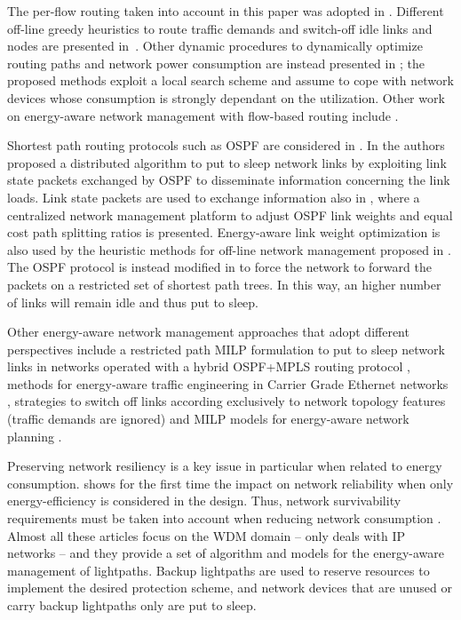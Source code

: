 \documentclass[final,5p,times,twocolumn]{elsarticle}
\begin{document}
The per-flow routing  taken into account in this paper was adopted in \cite{chiaraviglio11a,vasic10,avallone12}. Different off-line greedy heuristics to route traffic demands and switch-off idle links and nodes are presented in~\cite{chiaraviglio11a}. Other dynamic procedures to dynamically optimize routing paths and network power consumption are instead presented in  \cite{vasic10}; the proposed methods exploit a local search scheme and assume to cope with network devices whose consumption is strongly dependant on the utilization. Other work on energy-aware network management with flow-based routing include \cite{garroppo12a,garroppo12b,athanasiou11,chu11,coiro13,galanjiménez13,giroire12}.

Shortest path routing protocols such as OSPF are considered in \cite{bianzino12b,shen12,amaldi13,lee12,cianfrani12b}. In \cite{bianzino12b} the authors proposed a distributed algorithm to put to sleep network links by exploiting link state packets exchanged by OSPF to disseminate information concerning the link loads. Link state packets are used to exchange information also in \cite{shen12}, where a centralized network management platform to adjust OSPF link weights and equal cost path splitting ratios is presented. Energy-aware link weight optimization is also used by the heuristic methods for off-line network management proposed in \cite{amaldi13,lee12}. The OSPF protocol is instead modified in \cite{cianfrani12b} to force the network to forward the packets on a restricted set of shortest path trees. In this way, an higher number of links will remain idle and thus put to sleep.

Other energy-aware network management approaches that adopt different perspectives include a restricted path MILP formulation to put to sleep network links in networks operated with a hybrid OSPF+MPLS routing protocol \cite{zhang10}, methods for energy-aware traffic engineering in Carrier Grade Ethernet networks \cite{capone12a}, strategies to switch off links according exclusively to network topology features (traffic demands are ignored) \cite{cuomo12} and MILP models for energy-aware network planning \cite{idzikowski12}.


Preserving network resiliency is a key issue in particular when related to energy consumption. \cite{sanso09} shows for the first time
the impact on network reliability when only energy-efficiency is considered in the design. Thus, network survivability requirements must be taken into account when reducing network consumption \cite{monti11a,muhammad10,cavdar10,jirattigalachote11,bao12,aldraho12,he13,wu12,francois13}. Almost all these articles focus on the WDM domain -- only \cite{aldraho12,francois13} deals with IP networks -- and they provide a set of algorithm and models for the energy-aware management of lightpaths. Backup lightpaths are used to reserve resources to implement the desired protection scheme, and network devices that are unused or carry backup lightpaths only are put to sleep.
\end{document}
